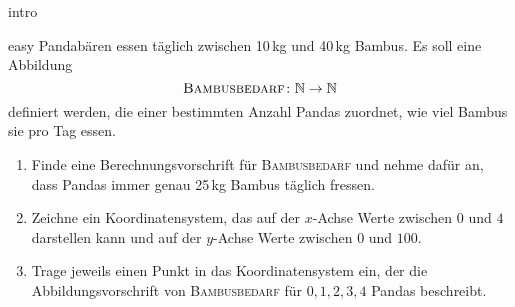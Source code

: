 \documentclass[../funktionen.tex]{subfiles}
\begin{document}
\begin{exercise}{intro}
    
\end{exercise}

\begin{exercise}{easy}
    Pandabären essen täglich zwischen 10\,kg und 40\,kg Bambus. Es soll eine Abbildung \[\textsc{Bambusbedarf}\colon\mathbb{N}\rightarrow\mathbb{N}\] definiert werden, die einer bestimmten Anzahl Pandas zuordnet, wie viel Bambus sie pro Tag essen.
    \begin{enumerate}
        \item Finde eine Berechnungsvorschrift für \textsc{Bambusbedarf} und nehme dafür an, dass Pandas immer genau 25\,kg Bambus täglich fressen.
        \item Zeichne ein Koordinatensystem, das auf der $x$-Achse Werte zwischen $0$ und $4$ darstellen kann und auf der $y$-Achse Werte zwischen $0$ und $100$.
        \item Trage jeweils einen Punkt in das Koordinatensystem ein, der die Abbildungsvorschrift von \textsc{Bambusbedarf} für $0, 1, 2, 3, 4$ Pandas beschreibt.
    \end{enumerate}
\end{exercise}
\end{document}
